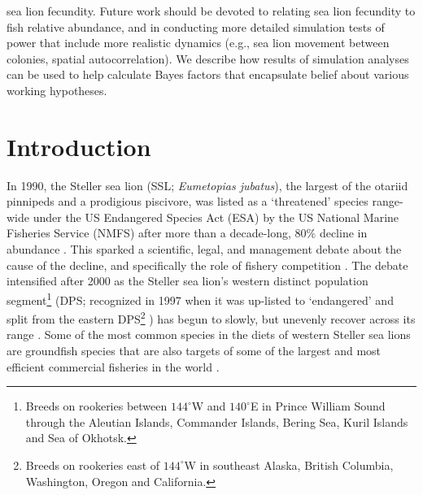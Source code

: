 \documentclass[11pt]{article}
\begin{document}
sea lion fecundity. Future work should be devoted to relating sea lion fecundity to fish relative abundance, and in conducting more detailed simulation tests of power that include more realistic dynamics (e.g., sea lion movement between colonies, spatial autocorrelation).  We describe how results of simulation analyses can be used to help calculate Bayes factors that encapsulate belief about various working hypotheses.




\clearpage

\renewcommand{\baselinestretch}{1.8}\normalsize


\section{Introduction}

In 1990, the Steller sea lion (SSL; {\it Eumetopias jubatus}), the largest of the otariid pinnipeds and a prodigious piscivore, was listed as a `threatened' species range-wide under the US Endangered Species Act (ESA) by the US National Marine Fisheries Service (NMFS) after more than a decade-long, 80\% decline in abundance \citep{CalkinsPitcher1982,LoughlinEtAl1992,NMFS1992}.  This sparked a scientific, legal, and management debate about the cause of the decline, and specifically the role of fishery competition \citep{Alverson1992,NMFS1992,FritzEtAl1995,RosenTrites2000,McBeath2004}.  The debate intensified after 2000 as the Steller sea lion's western distinct population segment\footnote[1]{Breeds on rookeries between $144^\circ$W and $140^\circ$E in Prince William Sound through the Aleutian Islands, Commander Islands, Bering Sea, Kuril Islands and Sea of Okhotsk.}  (DPS; recognized in 1997 when it was up-listed to  `endangered' and split from the eastern DPS\footnote[2]{Breeds on rookeries east of $144^\circ$W in southeast Alaska, British Columbia, Washington, Oregon and California.} ) has begun to slowly, but unevenly recover across its range \citep{Loughlin1997,JohnsonFritzInReview, NMFS2013}.  Some of the most common species in the diets of western Steller sea lions are groundfish species \citep[e.g., walleye pollock {\it Theragra chalcogramma}, Pacific cod {\it Gadus macrocephalus}, and Atka mackerel {\it Pleurogrammus monopterygius};][]{ SinclairZeppelin2002,TollitEtAl2004,ZeppelinEtAl2004,McKenzieWynne2008,WaiteEtAl2012} that are also targets of some of the largest and most efficient commercial fisheries in the world \citep{FissellEtAl2013}.
\end{document}
